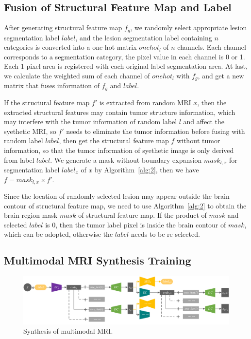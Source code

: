 \documentclass[letterpaper]{article} %
\begin{document}
\subsection{Fusion of Structural Feature Map and Label}

After generating structural feature map $f_g$, we randomly select appropriate lesion segmentation label $label$, and the lesion segmentation label containing $n$ categories is converted into a one-hot matrix $onehot_l$ of $n$ channels. Each channel corresponds to a segmentation category, the pixel value in each channel is 0 or 1. Each 1 pixel area is registered with each original label segmentation area. At last, we calculate the weighted sum of each channel of $onehot_l$ with $f_g$, and get a new matrix that fuses information of $f_g$ and $label$.

If the structural feature map $f'$ is extracted from random MRI $x$, then the extracted structural features may contain tumor structure information, which may interfere with the tumor information of random label $l$ and affect the syethetic MRI, so $f'$ needs to eliminate the tumor information before fusing with random label $label$, then get the structural feature map $f$ without tumor information, so that the tumor information of syethetic image is only derived from label $label$. We generate a mask without boundary expansion $mask_{l,x}$ for segmentation label $label_x$ of $x$ by Algorithm~\ref{alg:2}, then we have $f=mask_{l,x}\times f'$.

Since the location of randomly selected lesion may appear outside the brain contour of structural feature map, we need to use Algorithm~\ref{alg:2} to obtain the brain region mask $mask$ of structural feature map. If the product of $mask$ and selected $label$ is 0, then the tumor label pixel is inside the brain contour of $mask$, which can be adopted, otherwise the $label$ needs to be re-selected.

\subsection{Multimodal MRI Synthesis Training}
\begin{figure}
	\centering
	\includegraphics[width=0.98\columnwidth]{figures/mm_mri_generate}
	\caption{Synthesis of multimodal MRI.}
	\label{mm_mri_generate}
\end{figure}
\end{document}
